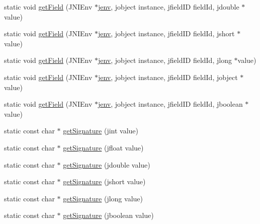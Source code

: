 \begin{DoxyCompactItemize}
\item 
static void \hyperlink{class_j_n_i_helper_a39cebd8486f32528314d28ecb1f709ca}{get\-Field} (J\-N\-I\-Env $\ast$\hyperlink{aparapi_8cpp_a31595c73e9a3750524b2ff61b5a14f96}{jenv}, jobject instance, jfield\-I\-D field\-Id, jdouble $\ast$value)
\item 
static void \hyperlink{class_j_n_i_helper_a232126b247a62164c157494aaa7e8486}{get\-Field} (J\-N\-I\-Env $\ast$\hyperlink{aparapi_8cpp_a31595c73e9a3750524b2ff61b5a14f96}{jenv}, jobject instance, jfield\-I\-D field\-Id, jshort $\ast$value)
\item 
static void \hyperlink{class_j_n_i_helper_ab2641ea86b0b292f9bd8861b60a97b21}{get\-Field} (J\-N\-I\-Env $\ast$\hyperlink{aparapi_8cpp_a31595c73e9a3750524b2ff61b5a14f96}{jenv}, jobject instance, jfield\-I\-D field\-Id, jlong $\ast$value)
\item 
static void \hyperlink{class_j_n_i_helper_a0096170be9f8685372dbf24ef35401a5}{get\-Field} (J\-N\-I\-Env $\ast$\hyperlink{aparapi_8cpp_a31595c73e9a3750524b2ff61b5a14f96}{jenv}, jobject instance, jfield\-I\-D field\-Id, jobject $\ast$value)
\item 
static void \hyperlink{class_j_n_i_helper_aec536897478d45cb8fea5f7396697eaa}{get\-Field} (J\-N\-I\-Env $\ast$\hyperlink{aparapi_8cpp_a31595c73e9a3750524b2ff61b5a14f96}{jenv}, jobject instance, jfield\-I\-D field\-Id, jboolean $\ast$value)
\item 
static const char $\ast$ \hyperlink{class_j_n_i_helper_ac4ea33f6aba560ceea078bf3ef2cc90f}{get\-Signature} (jint value)
\item 
static const char $\ast$ \hyperlink{class_j_n_i_helper_a89c38cc5a13ff61937e9d1f3fc8addea}{get\-Signature} (jfloat value)
\item 
static const char $\ast$ \hyperlink{class_j_n_i_helper_a9ed865d10a616b55449cf7f3e4620b2f}{get\-Signature} (jdouble value)
\item 
static const char $\ast$ \hyperlink{class_j_n_i_helper_a5949905b5e2730a12829398dba7032d2}{get\-Signature} (jshort value)
\item 
static const char $\ast$ \hyperlink{class_j_n_i_helper_aa9e066ff111d23fcbcab00cf03d53792}{get\-Signature} (jlong value)
\item 
static const char $\ast$ \hyperlink{class_j_n_i_helper_a0e9db8bd345fcce18ff7cee46c23b8a1}{get\-Signature} (jboolean value)
\end{DoxyCompactItemize}


